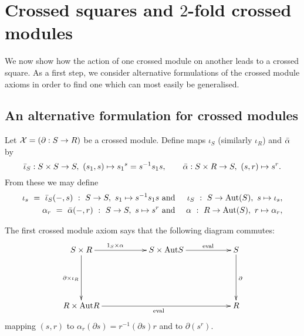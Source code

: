 
\section{Crossed squares and $2$-fold crossed modules} \label{sect:xxmod}

We now show how the action of one crossed module on another 
leads to a crossed square.
As a first step, we consider alternative formulations of the
crossed module axioms in order to find one which can most easily
be generalised.


\subsection{An alternative formulation for crossed modules} 
\label{subs:alt-viewt}

Let $\mathcal{X} = (\partial : S \to R)$  be a crossed module.
Define maps $\iota_S$ (similarly $\iota_R$) and $\bar{\alpha}$  by
$$
\bar{\iota}_S : S \times S \to S,~ (s_1,s) \mapsto {s_1}^s = s^{-1}s_1s,
\qquad
\bar{\alpha} : S \times R \to S,~ (s,r) \mapsto s^r.
$$
From these we may define
\begin{eqnarray*}
\iota_s ~=~ \bar{\iota}_S(-,s) ~:~ S \to S,~ s_1 \mapsto s^{-1}s_1s
& ~\mbox{and}~ &
\iota_S ~:~ S \to \mathrm{Aut}(S),~ s \mapsto \iota_s,  \\
\alpha_r ~=~ \bar{\alpha}(-,r) ~:~ S \to S,~ s \mapsto s^r
& ~\mbox{and}~ &
\alpha ~:~ R \to \mathrm{Aut}(S),~ r \mapsto \alpha_r,
\end{eqnarray*}

\medskip\noindent
The first crossed module axiom says that the following diagram commutes: 
\begin{equation} 
\vcenter{\xymatrix{
S \times R \ar[rr]^(0.4){1_S \times \alpha}
           \ar[dd]_{\partial \times \iota_R}
  && S \times \Aut S \ar[rr]^(0.6){{\rm eval}}
    && S \ar[dd]^{\partial} \\
  && && \\
R \times \Aut R \ar[rrrr]_{{\rm eval}}
  && && R
}} 
\end{equation}
mapping $(s,r)$ to $\alpha_r(\partial s) = r^{-1}(\partial s)r$ 
and to $\partial(s^r)$.

